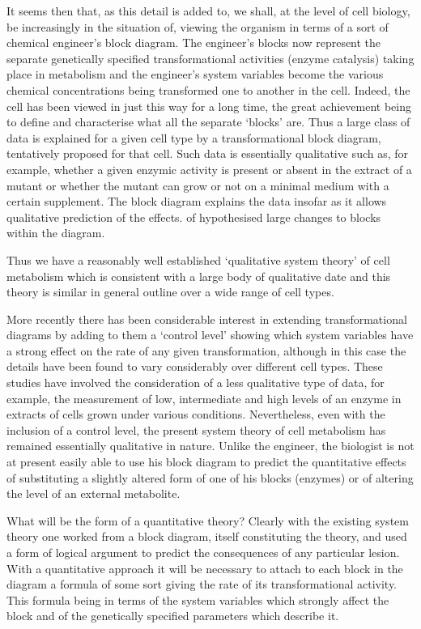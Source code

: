 It seems then that, as this detail is added to, we shall, at the level of cell biology, be increasingly in the situation of, viewing the organism in terms of a sort of chemical engineer's block diagram. The engineer's blocks now represent the separate genetically specified transformational activities (enzyme catalysis) taking place in metabolism and the engineer's system variables become the various chemical concentrations being transformed one to another in the cell. Indeed, the cell has been viewed in just this way for a long time, the great achievement being to define and characterise what all the separate `blocks' are. Thus a large class of data is explained for a given cell type by a transformational block diagram, tentatively proposed for that cell. Such data is essentially qualitative such as, for example, whether a given enzymic activity is present or absent in the extract of a mutant or whether the mutant can grow or not on a minimal medium with a certain supplement. The block diagram explains the data insofar as it allows qualitative prediction of the effects. of hypothesised large changes to blocks within the diagram.

Thus we have a reasonably well established `qualitative system theory' of cell metabolism which is consistent with a large body of qualitative date and this theory is similar in general outline over a wide range of cell types.

More recently there has been considerable interest in extending transformational diagrams by adding to them a `control level' showing which system variables have a strong effect on the rate of any given transformation, although in this case the details have been found to vary considerably over different cell types. These studies have involved the consideration of a less qualitative type of data, for example, the measurement of low, intermediate and high levels of an enzyme in extracts of cells grown under various conditions. Nevertheless, even with the inclusion of a control level, the present system theory of cell metabolism has remained essentially qualitative in nature. Unlike the engineer, the biologist is not at present easily able to use his block diagram to predict the quantitative effects of substituting a slightly altered form of one of his blocks (enzymes) or of altering the level of an external metabolite.

What will be the form of a quantitative theory? Clearly with the existing system theory one worked from a block diagram, itself constituting the theory, and used a form of logical argument to predict the consequences of any particular lesion. With a quantitative approach it will be necessary to attach to each block in the diagram a formula of some sort giving the rate of its transformational activity. This formula being in terms of the system variables which strongly affect the block and of the genetically specified parameters which describe it.

